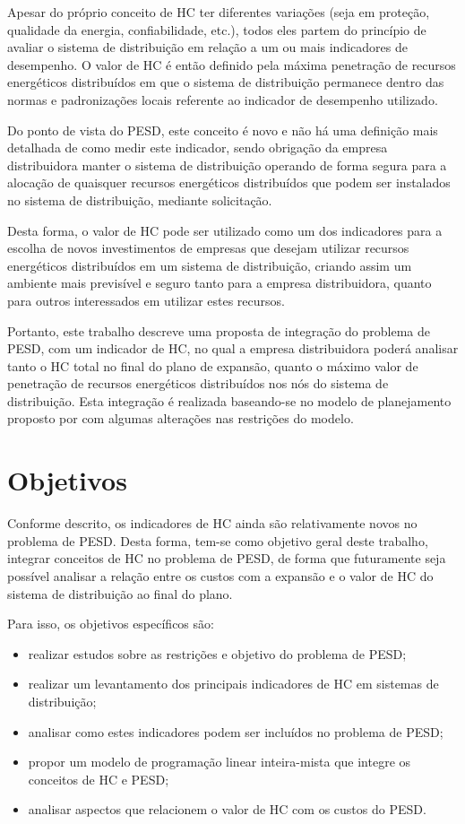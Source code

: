 Apesar do próprio conceito de \ac{HC} ter diferentes variações (seja em proteção, qualidade da energia, confiabilidade, etc.), todos eles partem do princípio de avaliar o sistema de distribuição em relação a um ou mais indicadores de desempenho. O valor de \ac{HC} é então definido pela máxima penetração de recursos energéticos distribuídos em que o sistema de distribuição permanece dentro das normas e padronizações locais referente ao indicador de desempenho utilizado. 

Do ponto de vista do \ac{PESD}, este conceito é novo e não há uma definição mais detalhada de como medir este indicador, sendo obrigação da empresa distribuidora manter o sistema de distribuição operando de forma segura para a alocação de quaisquer recursos energéticos distribuídos que podem ser instalados no sistema de distribuição, mediante solicitação.

Desta forma, o valor de \ac{HC} pode ser utilizado como um dos indicadores para a escolha de novos investimentos de empresas que desejam utilizar recursos energéticos distribuídos em um sistema de distribuição, criando assim um ambiente mais previsível e seguro tanto para a empresa distribuidora, quanto para outros interessados em utilizar estes recursos.

Portanto, este trabalho descreve uma proposta de integração do problema de \ac{PESD}, com um indicador de \ac{HC}, no qual a empresa distribuidora poderá analisar tanto o HC total no final do plano de expansão, quanto o máximo valor de penetração de recursos energéticos distribuídos nos nós do sistema de distribuição. Esta integração é realizada baseando-se no modelo de planejamento proposto por  com algumas alterações nas restrições do modelo. 

\section{Objetivos}

Conforme descrito, os indicadores de \ac{HC} ainda são relativamente novos no problema de \ac{PESD}. Desta forma, tem-se como objetivo geral deste trabalho, integrar conceitos de \ac{HC} no problema de \ac{PESD}, de forma que futuramente seja possível analisar a relação entre os custos com a expansão e o valor de \ac{HC} do sistema de distribuição ao final do plano.

Para isso, os objetivos específicos são:

\begin{itemize}
    \item realizar estudos sobre as restrições e objetivo do problema de \ac{PESD};
    \item realizar um levantamento dos principais indicadores de \ac{HC} em sistemas de distribuição;
    \item analisar como estes indicadores podem ser incluídos no problema de \ac{PESD};
    \item propor um modelo de programação linear inteira-mista que integre os conceitos de \ac{HC} e \ac{PESD};
    \item analisar aspectos que relacionem o valor de \ac{HC} com os custos do \ac{PESD}.
\end{itemize}



